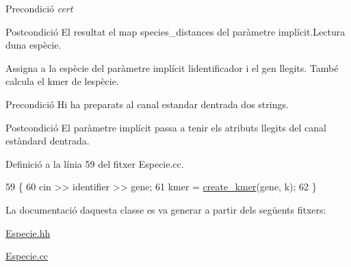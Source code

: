 \begin{DoxyPrecond}{Precondició}
{\itshape cert} 
\end{DoxyPrecond}
\begin{DoxyPostcond}{Postcondició}
El resultat el map species\+\_\+distances del paràmetre implícit.\+Lectura d\textquotesingle{}una espècie.
\end{DoxyPostcond}
Assigna a la espècie del paràmetre implícit l\textquotesingle{}identificador i el gen llegits. També calcula el kmer de l\textquotesingle{}espècie.

\begin{DoxyPrecond}{Precondició}
Hi ha preparats al canal estandar d\textquotesingle{}entrada dos strings. 
\end{DoxyPrecond}
\begin{DoxyPostcond}{Postcondició}
El paràmetre implícit passa a tenir els atributs llegits del canal estàndard d\textquotesingle{}entrada. 
\end{DoxyPostcond}


Definició a la línia 59 del fitxer Especie.\+cc.


\begin{DoxyCode}
59                                        \{
60     cin >> identifier >> gene;
61     kmer = \hyperlink{class_especie_a7e6c7615ab5458259c1f20bcd68ebd80}{create\_kmer}(gene, k);
62 \}
\end{DoxyCode}


La documentació d\textquotesingle{}aquesta classe es va generar a partir dels següents fitxers\+:\begin{DoxyCompactItemize}
\item 
\hyperlink{_especie_8hh}{Especie.\+hh}\item 
\hyperlink{_especie_8cc}{Especie.\+cc}\end{DoxyCompactItemize}
